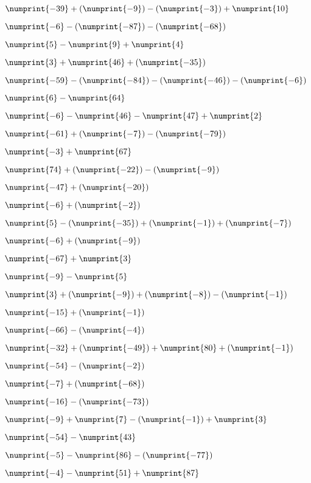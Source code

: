 {{\item$\numprint{-39} + (\numprint{-9}) - (\numprint{-3}) + \numprint{10}$  \item$\numprint{-6} - (\numprint{-87}) - (\numprint{-68})$  \item$\numprint{5} - \numprint{9} + \numprint{4}$

\item$\numprint{3} + \numprint{46} + (\numprint{-35})$  \item$\numprint{-59} - (\numprint{-84}) - (\numprint{-46}) - (\numprint{-6})$  \item$\numprint{6} - \numprint{64}$

\item$\numprint{-6} - \numprint{46} - \numprint{47} + \numprint{2}$  \item$\numprint{-61} + (\numprint{-7}) - (\numprint{-79})$  \item$\numprint{-3} + \numprint{67}$

\item$\numprint{74} + (\numprint{-22}) - (\numprint{-9})$  \item$\numprint{-47} + (\numprint{-20})$  \item$\numprint{-6} + (\numprint{-2})$

\item$\numprint{5} - (\numprint{-35}) + (\numprint{-1}) + (\numprint{-7})$  \item$\numprint{-6} + (\numprint{-9})$  \item$\numprint{-67} + \numprint{3}$

\item$\numprint{-9} - \numprint{5}$  \item$\numprint{3} + (\numprint{-9}) + (\numprint{-8}) - (\numprint{-1})$  \item$\numprint{-15} + (\numprint{-1})$

\item$\numprint{-66} - (\numprint{-4})$  \item$\numprint{-32} + (\numprint{-49}) + \numprint{80} + (\numprint{-1})$  \item$\numprint{-54} - (\numprint{-2})$

\item$\numprint{-7} + (\numprint{-68})$  \item$\numprint{-16} - (\numprint{-73})$  \item$\numprint{-9} + \numprint{7} - (\numprint{-1}) + \numprint{3}$

\item$\numprint{-54} - \numprint{43}$  \item$\numprint{-5} - \numprint{86} - (\numprint{-77})$  \item$\numprint{-4} - \numprint{51} + \numprint{87}$

}}
